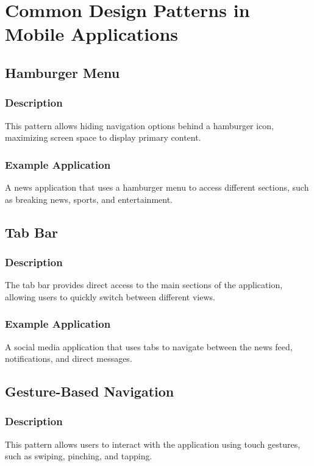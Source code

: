 \documentclass[conference]{IEEEtran}
\begin{document}
\section{Common Design Patterns in Mobile Applications}

\subsection{Hamburger Menu}

\subsubsection{Description}
This pattern allows hiding navigation options behind a hamburger icon, maximizing screen space to display primary content.

\subsubsection{Example Application}
A news application that uses a hamburger menu to access different sections, such as breaking news, sports, and entertainment.

\subsection{Tab Bar}

\subsubsection{Description}
The tab bar provides direct access to the main sections of the application, allowing users to quickly switch between different views.

\subsubsection{Example Application}
A social media application that uses tabs to navigate between the news feed, notifications, and direct messages.

\subsection{Gesture-Based Navigation}

\subsubsection{Description}
This pattern allows users to interact with the application using touch gestures, such as swiping, pinching, and tapping.
\end{document}
